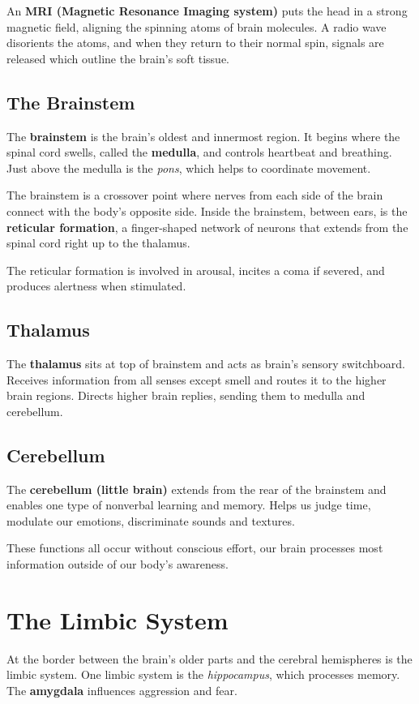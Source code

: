 \documentclass[12pt]{article}
\begin{document}
An \textbf{MRI (Magnetic Resonance Imaging system)} puts the head in a strong magnetic field, aligning the spinning atoms of brain molecules. A radio wave disorients the atoms, and when they return to their normal spin, signals are released which outline the brain's soft tissue.

\subsection*{The Brainstem}
The \textbf{brainstem} is the brain's oldest and innermost region. It begins where the spinal cord swells, called the \textbf{medulla}, and controls heartbeat and breathing. Just above the medulla is the \textit{pons}, which helps to coordinate movement.

The brainstem is a crossover point where nerves from each side of the brain connect with the body's opposite side. Inside the brainstem, between ears, is the \textbf{reticular formation}, a finger-shaped network of neurons that extends from the spinal cord right up to the thalamus.

The reticular formation is involved in arousal, incites a coma if severed, and produces alertness when stimulated.

\subsection*{Thalamus}
The {\bf thalamus} sits at top of brainstem and acts as brain's sensory switchboard. Receives information from all senses except smell and routes it to the higher brain regions. Directs higher brain replies, sending them to medulla and cerebellum.

\subsection*{Cerebellum}
The {\bf cerebellum (little brain)} extends from the rear of the brainstem and enables one type of nonverbal learning and memory. Helps us judge time, modulate our emotions, discriminate sounds and textures.

These functions all occur without conscious effort, our brain processes most information outside of our body's awareness.

\section*{The Limbic System}
At the border between the brain's older parts and the cerebral hemispheres is the limbic system. One limbic system is the \textit{hippocampus}, which processes memory. The {\bf amygdala} influences aggression and fear.
\end{document}
